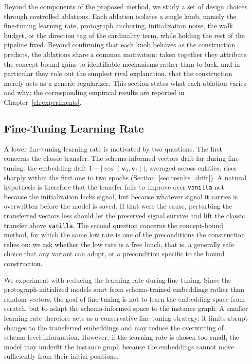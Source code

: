 \documentclass[a4paper,oneside,bibliography=totoc]{scrbook}
\begin{document}
Beyond the components of the proposed method, we study a set of design choices
through controlled ablations. Each ablation isolates a single knob, namely the
fine-tuning learning rate, protograph anchoring, initialization noise, the walk
budget, or the direction tag of the cardinality term, while holding the rest
of the pipeline fixed. Beyond confirming that each knob behaves as the
construction predicts, the ablations share a common motivation: taken together
they attribute the concept-bound gains to identifiable mechanisms rather than to
luck, and in particular they rule out the simplest rival explanation, that the
construction merely acts as a generic regularizer. This section states what each
ablation varies and why; the corresponding empirical results are reported in
Chapter~\ref{ch:experiments}.

\subsection{Fine-Tuning Learning Rate}
\label{sec:abl_lr}

A lower fine-tuning learning rate is motivated by two questions. The first
concerns the classic transfer. The schema-informed vectors drift far during
fine-tuning: the embedding drift $1 - |\cos(\mathbf{v}_0, \mathbf{v}_t)|$, averaged
across entities, rises sharply within the first one to two epochs
(Section~\ref{sec:results_drift}). A natural hypothesis is therefore that the
transfer fails to improve over \texttt{vanilla} not because the initialization
lacks signal, but because whatever signal it carries is overwritten before the
model is saved. If that were the cause, perturbing the transferred vectors less
should let the preserved signal survive and lift the classic transfer above
\texttt{vanilla}. The second question concerns the concept-bound method, for
which the same low rate is one of the preconditions the construction relies on:
we ask whether the low rate is a free lunch, that is, a generally safe choice
that any variant can adopt, or a precondition specific to the bound construction.

We experiment with reducing the learning rate during fine-tuning. Since the
protograph-initialized models start from schema-trained embeddings rather than
random vectors, the goal of fine-tuning is not to learn the embedding space from
scratch, but to adapt the schema-informed space to the instance graph. A smaller
learning rate therefore acts as a conservative fine-tuning strategy: it limits
abrupt changes to the transferred embeddings and may reduce the overwriting of
schema-level information. However, if the learning rate is chosen too small, the
model may underfit the instance graph because the embeddings cannot move
sufficiently from their initial positions.
\end{document}
